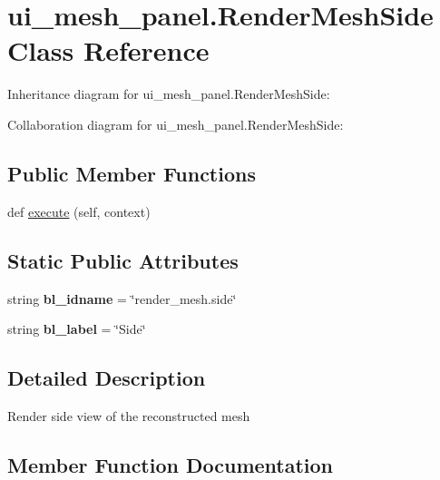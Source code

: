 \hypertarget{classui__mesh__panel_1_1RenderMeshSide}{}\section{ui\+\_\+mesh\+\_\+panel.\+Render\+Mesh\+Side Class Reference}
\label{classui__mesh__panel_1_1RenderMeshSide}


Inheritance diagram for ui\+\_\+mesh\+\_\+panel.\+Render\+Mesh\+Side\+:


Collaboration diagram for ui\+\_\+mesh\+\_\+panel.\+Render\+Mesh\+Side\+:
\subsection*{Public Member Functions}
\begin{DoxyCompactItemize}
\item 
def \hyperlink{classui__mesh__panel_1_1RenderMeshSide_a97820be9be0a9087a3dce413319af5b5}{execute} (self, context)
\end{DoxyCompactItemize}
\subsection*{Static Public Attributes}
\begin{DoxyCompactItemize}
\item 
string {\bfseries bl\+\_\+idname} = \char`\"{}render\+\_\+mesh.\+side\char`\"{}\hypertarget{classui__mesh__panel_1_1RenderMeshSide_ae1b37c5af83ca29f4256c8c2e2bcce88}{}\label{classui__mesh__panel_1_1RenderMeshSide_ae1b37c5af83ca29f4256c8c2e2bcce88}

\item 
string {\bfseries bl\+\_\+label} = \char`\"{}Side\char`\"{}\hypertarget{classui__mesh__panel_1_1RenderMeshSide_aeb85b63a87bf58c1429399b1acd20161}{}\label{classui__mesh__panel_1_1RenderMeshSide_aeb85b63a87bf58c1429399b1acd20161}

\end{DoxyCompactItemize}


\subsection{Detailed Description}
\begin{DoxyVerb}Render side view of the reconstructed mesh\end{DoxyVerb}
 

\subsection{Member Function Documentation}
